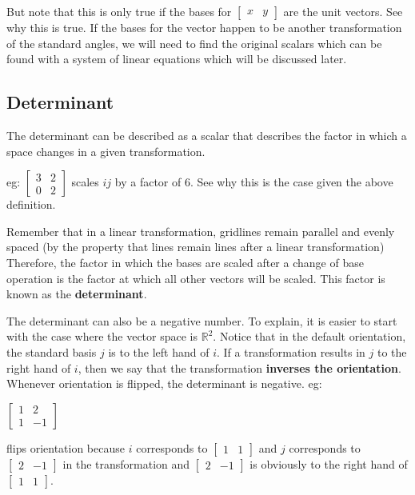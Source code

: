 \documentclass[12pt]{report}
\begin{document}
But note that this is only true if the bases for $\begin{bmatrix}x & y\end{bmatrix}$ are the unit vectors. See why this is true. If the bases for the vector happen to be another transformation of the standard angles, we will need to find the original scalars which can be found with a system of linear equations which will be discussed later.

\subsection{Determinant}
The determinant can be described as a scalar that describes the factor in which a space changes in a given transformation.
\begin{center}
eg: $\begin{bmatrix}3 & 2 \\ 0 & 2\end{bmatrix}$ scales $ij$ by a factor of $6$. See why this is the case given the above definition.
\end{center}
Remember that in a linear transformation, gridlines remain parallel and evenly spaced (by the property that lines remain lines after a linear transformation) Therefore, the factor in which the bases are scaled after a change of base operation is the factor at which all other vectors will be scaled.
This factor is known as the \textbf{determinant}.\medskip


The determinant can also be a negative number. To explain, it is easier to start with the case where the vector space is $\mathbb{R}^2$.
Notice that in the default orientation, the standard basis $j$ is to the left hand of $i$. If a transformation results in $j$ to the right hand of $i$, then we say that the transformation \textbf{inverses the orientation}. Whenever orientation is flipped, the determinant is negative. eg:
\begin{center}
$\begin{bmatrix}1 & 2 \\ 1 & -1\end{bmatrix}$
\end{center}
flips orientation because $i$ corresponds to $\begin{bmatrix}1 & 1\end{bmatrix}$ and $j$ corresponds to $\begin{bmatrix}2&-1\end{bmatrix}$ in the transformation and $\begin{bmatrix}2&-1\end{bmatrix}$ is obviously to the right hand of $\begin{bmatrix}1 & 1\end{bmatrix}$.
\end{document}

